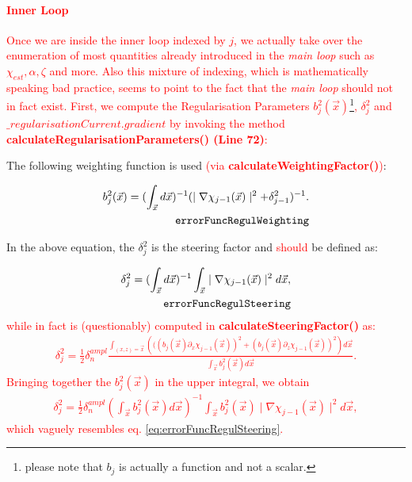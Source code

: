 \documentclass[10pt,a4paper]{article}
\begin{document}
\textcolor{red}{
\paragraph{Inner Loop}
Once we are inside the inner loop indexed by $j$, we actually take over the enumeration of most quantities already introduced in the \textit{main loop} such as $\chi_{est}, \alpha, \zeta$ and more. Also this mixture of indexing, which is mathematically speaking bad practice, seems to point to the fact that the \textit{main loop} should not in fact exist.
\newline
First, we compute the Regularisation Parameters $b^2_j(\vec{x})$\footnote{please note that $b_j$ is actually a function and not a scalar.}, $\delta^2_j$  and $\_regularisationCurrent.gradient$ by invoking the method \textbf{calculateRegularisationParameters() (Line 72)}:
}

The following weighting function is used \textcolor{red}{(via \textbf{calculateWeightingFactor()})}:

\begin{align} \label{eq:errorFuncRegulWeighting} b_j^{2}(\vec{x}) = (\int_{\vec{x}}
d\vec{x})^{-1} (\mid\nabla\chi_{j-1}(\vec{x})\mid^2 + \delta_{j-1}^2)^{-1}.\\
\tag*{\texttt{errorFuncRegulWeighting}}
\end{align}

In the above equation, the $\delta_{j}^2$ is the steering factor and
\textcolor{red}{should} be defined as:

\begin{align} \label{eq:errorFuncRegulSteering} \delta_{j}^2 = (\int_{\vec{x}}
d\vec{x})^{-1} \int_{\vec{x}} \mid\nabla\chi_{j-1}(\vec{x})\mid^2 d\vec{x},\\
\tag*{\texttt{errorFuncRegulSteering}}
\end{align}
\textcolor{red}{while in fact is (questionably) computed in \textbf{calculateSteeringFactor()} as:
\begin{align}  \delta_j^2 = \frac{1}{2} \delta^{ampl}_n \frac{\int_{(x,z) = \vec{x}}\left(((b_j(\vec{x}) \partial_x \chi_{j-1}(\vec{x}))^2  + (b_j(\vec{x}) \partial_z \chi_{j-1}(\vec{x}))^2\right) d \vec{x}}{\int_{\vec{x}}b_j^2(\vec{x}) d \vec{x}}.
\end{align}
Bringing together the $b_j^2(\vec{x})$ in the upper integral, we obtain
\begin{align}
\delta_{j}^2 = \frac{1}{2} \delta^{ampl}_n \left(\int_{\vec{x}}
b_j^2(\vec{x})d\vec{x}\right)^{-1} \int_{\vec{x}} b_j^2(\vec{x}) \mid\nabla\chi_{j-1}(\vec{x})\mid^2 d\vec{x},
\end{align}
which vaguely resembles eq. \eqref{eq:errorFuncRegulSteering}.
}
\newline
\end{document}
